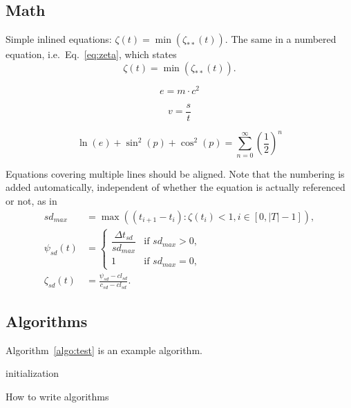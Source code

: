 \subsection{Math}

Simple inlined equations: $\zeta(t) = \min( \zeta_{**}(t))$.
The same in a numbered equation, i.e.\ Eq.~\ref{eq:zeta}, which states
\begin{equation}
\zeta(t) =
    \min\left(
        \zeta_{**}(t)
    \right)
\label{eq:zeta}
.
\end{equation}

\begin{equation}
    e = m \cdot c^2
    \label{eq:ex1}
\end{equation}


\[ v = \frac{s}{t} \]

\begin{equation}
    \ln(e) + \sin^2(p) + \cos^2 (p) = \sum_{n=0}^{\infty} \left(\frac{1}{2}\right)^n
    \label{eq:ex2}
\end{equation}


Equations covering multiple lines should be aligned. Note that the numbering is added automatically, independent of whether the equation is actually referenced or not, as in
\begin{align}
sd_{max} &=
    \max\left(
        (t_{i+1} - t_i)
            : \zeta(t_i) < 1, i \in [0, |T|-1]
    \right)
,\\
\psi_{sd}(t) &=
    \begin{cases}
        \dfrac{\Delta t_{sd}}{sd_{max}}
            & \text{if $sd_{max} > 0$}, \\
        1
            & \text{if $sd_{max} = 0$},
    \end{cases}
\\
\zeta_{sd}(t) &=
    \frac{
        \psi_{sd} - cl_{sd}
    }{
        c_{sd} - cl_{sd}
    }
.
\end{align}


\subsection{Algorithms}
Algorithm~\ref{algo:test} is an example algorithm.

\begin{algorithm}[H]
    initialization\;
    \caption{How to write algorithms}
    \label{algo:test}
\end{algorithm}

